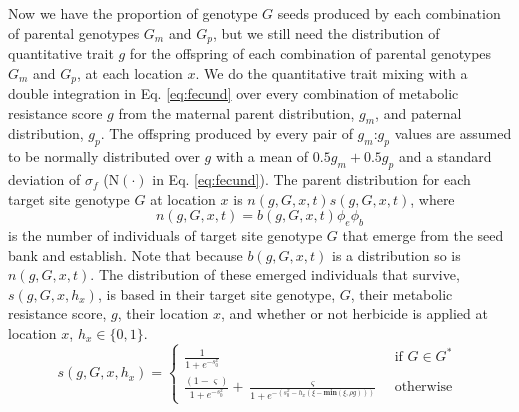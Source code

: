 \documentclass[10pt,letterpaper]{article}
\begin{document}
Now we have the proportion of genotype $G$ seeds produced by each combination of parental genotypes $G_m$ and $G_p$, but we still need the distribution of quantitative trait $g$ for the offspring of each combination of parental genotypes $G_m$ and $G_p$, at each location $x$. We do the quantitative trait mixing with a double integration in Eq. \ref{eq:fecund} over every combination of metabolic resistance score $g$ from the maternal parent distribution, $g_m$, and paternal distribution, $g_p$. The offspring produced by every pair of $g_m$:$g_p$ values are assumed to be normally distributed over $g$ with a mean of $0.5g_m + 0.5g_p$ and a standard deviation of $\sigma_f$ ($\text{N}(\cdot)$ in Eq. \ref{eq:fecund}). The parent distribution for each target site genotype $G$ at location $x$ is $n(g, G, x, t)s(g, G, x, t)$, where 
\begin{equation}\label{eq:above_ground}
	n(g, G, x, t) = b(g, G, x, t)\phi_e\phi_b
\end{equation}
is the number of individuals of target site genotype $G$ that emerge from the seed bank and establish. Note that because $b(g, G, x, t)$ is a distribution so is $n(g, G, x, t)$. The distribution of these emerged individuals that survive, $s(g, G, x, h_x)$, is based in their target site genotype, $G$, their metabolic resistance score, $g$, their location $x$, and whether or not herbicide is applied at location $x$, $h_x \in \{0, 1\}$.   
\begin{equation}\label{eq:sur_G}
	s(g, G, x, h_x) = \begin{cases} 
		\frac{1}{1 + e^{-s_0^x}} &\text{~if~} G \in G^* \\
		\frac{(1 - \varsigma)}{1 + e^{-s_0^x}} + \frac{\varsigma}{1 + e^{-\left(s_0^x - h_x\left(\xi - \textbf{min}(\xi, \rho g) \right)\right)}} &\text{~otherwise~} 		
	\end{cases} 
\end{equation}
\end{document}
